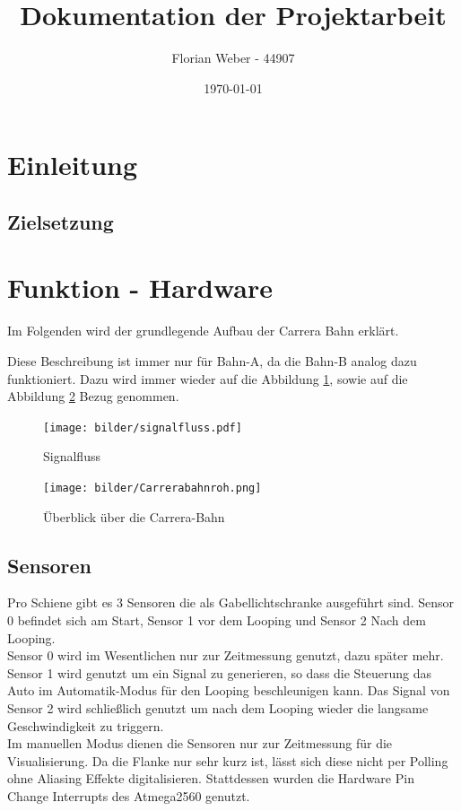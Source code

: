 \documentclass[a4paper, 11pt]{scrartcl}
\title{Dokumentation der Projektarbeit}
\author{Florian Weber - 44907}
\date{\today}
\begin{document}
\maketitle	%
\newpage

\tableofcontents 	%
\listoffigures		%
\newpage

\section{Einleitung}
\subsection{Zielsetzung}
\newpage

\section{Funktion - Hardware}
	Im Folgenden wird der grundlegende Aufbau der Carrera Bahn erklärt.

	Diese Beschreibung ist immer nur für Bahn-A, da die 
	Bahn-B analog dazu funktioniert. Dazu wird immer wieder auf die Abbildung \ref{img:signalfluss}, sowie auf die \\Abbildung 
	\ref{img:carrerakomplett} Bezug genommen.
	\begin{figure}[h]
		\centering
		\texttt{[image: bilder/signalfluss.pdf]}
		\caption{Signalfluss}
		\label{img:signalfluss}
	\end{figure}
	\begin{figure}[h]
	\centering
	\texttt{[image: bilder/Carrerabahnroh.png]}
	\caption{Überblick über die Carrera-Bahn}
	\label{img:carrerakomplett}
	\end{figure}
	\newpage

	\subsection{Sensoren}
		Pro Schiene gibt es 3 Sensoren die als Gabellichtschranke ausgeführt sind. Sensor 0 befindet sich am Start, Sensor 1 vor dem Looping und 		Sensor 2 Nach dem Looping.\\

		Sensor 0 wird im Wesentlichen nur zur Zeitmessung genutzt, dazu später mehr.
		Sensor 1 wird genutzt um ein Signal zu generieren, so dass die Steuerung das Auto im Automatik-Modus für den Looping beschleunigen kann. 		Das Signal von Sensor 2 wird schließlich genutzt um nach dem Looping wieder die langsame Geschwindigkeit zu triggern.\\
		Im manuellen Modus dienen die Sensoren nur zur Zeitmessung für die Visualisierung.
		Da die Flanke nur sehr kurz ist, lässt sich diese nicht per Polling ohne Aliasing Effekte digitalisieren. Stattdessen wurden die Hardware 		Pin Change Interrupts des Atmega2560 genutzt.
\end{document}
